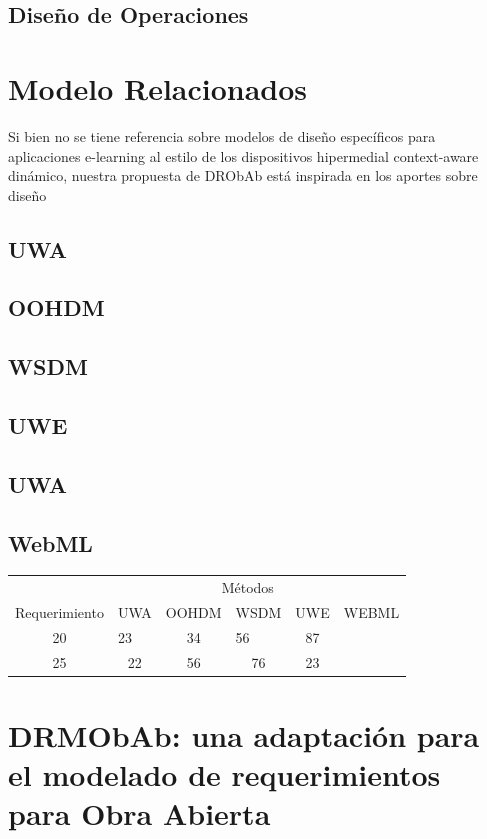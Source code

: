 \documentclass{llncs}
\begin{document}
\subsection{Diseño de Operaciones}

\section{Modelo Relacionados}

Si bien no se tiene referencia sobre modelos de diseño específicos para aplicaciones e-learning al estilo de los dispositivos hipermedial context-aware dinámico, nuestra propuesta de DRObAb está inspirada en los aportes sobre diseño  

\subsection{UWA}
\subsection{OOHDM}
\subsection{WSDM}
\subsection{UWE}
\subsection{UWA}
\subsection{WebML}

 \begin{center}\begin{tabular}{cccccc}
  & &  \multicolumn{3}{c}{Métodos} \\ 
 Requerimiento & UWA &  OOHDM &  WSDM &  UWE & WEBML \\ 
 \hline 
 20 &  \multicolumn{1}{l}{23} &  34 &  \multicolumn{1}{l}{56} & 87 \\ 
 \cline{2-2} \cline{4-4} 
 25 &  22 &  56 &  76 & 23 \\ 
 \hline 
 \end{tabular}\end{center} 
 
\section{DRMObAb: una adaptación para el modelado de requerimientos para Obra Abierta}
\end{document}
